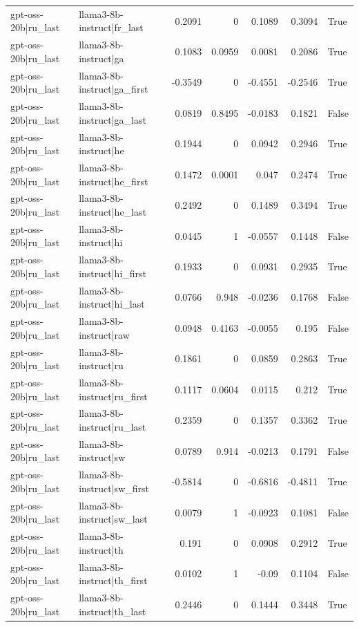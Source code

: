 \begin{table}
\begin{tabular}{l l r r r r l}
gpt-oss-20b|ru_last & llama3-8b-instruct|fr_last & 0.2091 & 0 & 0.1089 & 0.3094 & True \\
gpt-oss-20b|ru_last & llama3-8b-instruct|ga & 0.1083 & 0.0959 & 0.0081 & 0.2086 & True \\
gpt-oss-20b|ru_last & llama3-8b-instruct|ga_first & -0.3549 & 0 & -0.4551 & -0.2546 & True \\
gpt-oss-20b|ru_last & llama3-8b-instruct|ga_last & 0.0819 & 0.8495 & -0.0183 & 0.1821 & False \\
gpt-oss-20b|ru_last & llama3-8b-instruct|he & 0.1944 & 0 & 0.0942 & 0.2946 & True \\
gpt-oss-20b|ru_last & llama3-8b-instruct|he_first & 0.1472 & 0.0001 & 0.047 & 0.2474 & True \\
gpt-oss-20b|ru_last & llama3-8b-instruct|he_last & 0.2492 & 0 & 0.1489 & 0.3494 & True \\
gpt-oss-20b|ru_last & llama3-8b-instruct|hi & 0.0445 & 1 & -0.0557 & 0.1448 & False \\
gpt-oss-20b|ru_last & llama3-8b-instruct|hi_first & 0.1933 & 0 & 0.0931 & 0.2935 & True \\
gpt-oss-20b|ru_last & llama3-8b-instruct|hi_last & 0.0766 & 0.948 & -0.0236 & 0.1768 & False \\
gpt-oss-20b|ru_last & llama3-8b-instruct|raw & 0.0948 & 0.4163 & -0.0055 & 0.195 & False \\
gpt-oss-20b|ru_last & llama3-8b-instruct|ru & 0.1861 & 0 & 0.0859 & 0.2863 & True \\
gpt-oss-20b|ru_last & llama3-8b-instruct|ru_first & 0.1117 & 0.0604 & 0.0115 & 0.212 & True \\
gpt-oss-20b|ru_last & llama3-8b-instruct|ru_last & 0.2359 & 0 & 0.1357 & 0.3362 & True \\
gpt-oss-20b|ru_last & llama3-8b-instruct|sw & 0.0789 & 0.914 & -0.0213 & 0.1791 & False \\
gpt-oss-20b|ru_last & llama3-8b-instruct|sw_first & -0.5814 & 0 & -0.6816 & -0.4811 & True \\
gpt-oss-20b|ru_last & llama3-8b-instruct|sw_last & 0.0079 & 1 & -0.0923 & 0.1081 & False \\
gpt-oss-20b|ru_last & llama3-8b-instruct|th & 0.191 & 0 & 0.0908 & 0.2912 & True \\
gpt-oss-20b|ru_last & llama3-8b-instruct|th_first & 0.0102 & 1 & -0.09 & 0.1104 & False \\
gpt-oss-20b|ru_last & llama3-8b-instruct|th_last & 0.2446 & 0 & 0.1444 & 0.3448 & True \\

\end{tabular}
\end{table}
